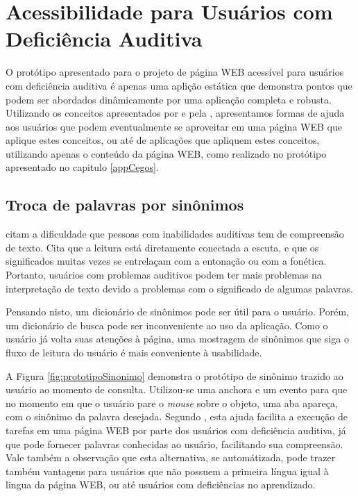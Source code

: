 \documentclass[
	12pt,				%
	oneside,			%
	a4paper,			%
	english,			%
	brazil				%
	]{abntex2ppgsi}
\begin{document}
\chapter{Acessibilidade para Usuários com Deficiência Auditiva}

O protótipo apresentado para o projeto de página WEB acessível para usuários com deficiência auditiva é apenas uma aplição estática que demonstra pontos que podem ser abordados dinâmicamente por uma aplicação completa e robusta. Utilizando os conceitos apresentados por  e pela , apresentamos formas de ajuda aos usuários que podem eventualmente se aproveitar em uma página WEB que aplique estes conceitos, ou até de aplicações que apliquem estes conceitos, utilizando apenas o conteúdo da página WEB, como realizado no protótipo apresentado no capitulo \ref{appCegos}.

\section{Troca de palavras por sinônimos}

 citam a dificuldade que pessoas com inabilidades auditivas tem de compreensão de texto. Cita que a leitura está diretamente conectada a escuta, e que os significados muitas vezes se entrelaçam com a entonação ou com a fonética. Portanto, usuários com problemas auditivos podem ter mais problemas na interpretação de texto devido a problemas com o significado de algumas palavras.

Pensando nisto, um dicionário de sinônimos pode ser útil para o usuário. Porém, um dicionário de busca pode ser inconveniente ao uso da aplicação. Como o usuário já volta suas atenções à página, uma mostragem de sinônimos que siga o fluxo de leitura do usuário é mais conveniente à usabilidade. 

A Figura \ref{fig:prototipoSinonimo} demonstra o  protótipo de sinônimo trazido ao usuário ao momento de consulta. Utilizou-se uma anchora e um evento para que no momento em que o usuário pare o \textit{mouse} sobre o objeto, uma aba apareça, com o sinônimo da palavra desejada. Segundo , esta ajuda facilita a execução de tarefas em uma página WEB por parte dos usuários com deficiência auditiva, já que pode fornecer palavras conhecidas ao usuário, facilitando sua compreensão. Vale também a observação que esta alternativa, se automátizada, pode trazer também vantagens para usuários que não possuem a primeira língua igual à lingua da página WEB, ou até usuários com deficiências no aprendizado.
\end{document}
